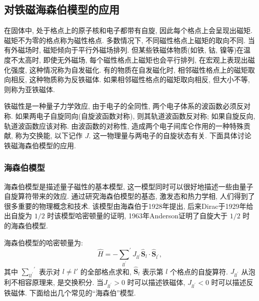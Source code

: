 \subsection{对铁磁海森伯模型的应用}
在固体中, 处于格点上的原子核和电子都带有自旋, 因此每个格点上会呈现出磁矩. 磁矩不为零的格点称为磁性格点. 多数情况下, 不同磁性格点上磁矩的取向不同. 当有外磁场时, 磁矩倾向于平行外磁场排列. 但某些铁磁体物质(如铁, 钴, 镍等)在温度不太高时, 即使无外磁场, 每个磁性格点上磁矩也会平行排列, 在宏观上表现出磁化强度, 这种情况称为自发磁化. 有的物质在自发磁化时, 相邻磁性格点上的磁矩取向相反, 这种物质称为反铁磁体.
如果相邻磁性格点的磁矩取向相反, 但大小不等, 则称为亚铁磁体. 

铁磁性是一种量子力学效应, 由于电子的全同性, 两个电子体系的波函数必须反对称. 如果两电子自旋同向(自旋波函数对称), 则其轨道波函数反对称; 如果自旋反向, 轨道波函数应该对称. 由波函数的对称性, 造成两个电子间库仑作用的一种特殊贡献, 称为交换能, 以下记作 $J$. 这一物理量与两电子的自旋状态有关. 下面具体讨论铁磁海森伯模型的应用.
\subsubsection{海森伯模型}
海森伯模型是描述量子磁性的基本模型, 这一模型同时可以很好地描述一些由量子自旋算符带来的效应. 通过研究海森伯模型的基态, 激发态和热力学相, 人们得到了很多重要的物理概念和技术. 该模型由海森伯于1928年提出, 后来Dirac于1929年给出自旋为 $1 / 2$ 时该模型哈密顿量的证明, 1963年Anderson证明了自旋大于 $1 / 2$ 时的海森伯模型. 


海森伯模型的哈密顿量为:
\begin{equation}
\hat{H}=-{\sum_{ll^{\prime}}}^{\prime} J_{l l^{\prime}} \hat{\boldsymbol{S}}_{l} \cdot \hat{\boldsymbol{S}}_{l^{\prime}},
\end{equation}
其中 $\displaystyle{\sum_{ll^{\prime}}}^{\prime}$ 表示对 $l\neq l'$ 的全部格点求和, $\hat{\boldsymbol{S}}_{l}$ 表示第 $l$ 个格点的自旋算符. $J_{l l^{\prime}}$ 从泡利不相容原理来, 是交换积分. 当$J_{l l^{\prime}}>0$ 时可以描述铁磁体, $J_{l l^{\prime}}<0$ 时可以描述反铁磁体. 下面给出几个常见的“海森伯”模型.


